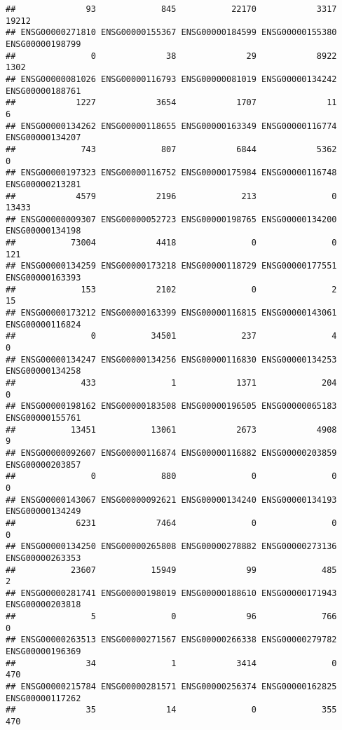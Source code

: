 \documentclass[
]{article}
\begin{document}
\begin{verbatim}
##              93             845           22170            3317           19212 
## ENSG00000271810 ENSG00000155367 ENSG00000184599 ENSG00000155380 ENSG00000198799 
##               0              38              29            8922            1302 
## ENSG00000081026 ENSG00000116793 ENSG00000081019 ENSG00000134242 ENSG00000188761 
##            1227            3654            1707              11               6 
## ENSG00000134262 ENSG00000118655 ENSG00000163349 ENSG00000116774 ENSG00000134207 
##             743             807            6844            5362               0 
## ENSG00000197323 ENSG00000116752 ENSG00000175984 ENSG00000116748 ENSG00000213281 
##            4579            2196             213               0           13433 
## ENSG00000009307 ENSG00000052723 ENSG00000198765 ENSG00000134200 ENSG00000134198 
##           73004            4418               0               0             121 
## ENSG00000134259 ENSG00000173218 ENSG00000118729 ENSG00000177551 ENSG00000163393 
##             153            2102               0               2              15 
## ENSG00000173212 ENSG00000163399 ENSG00000116815 ENSG00000143061 ENSG00000116824 
##               0           34501             237               4               0 
## ENSG00000134247 ENSG00000134256 ENSG00000116830 ENSG00000134253 ENSG00000134258 
##             433               1            1371             204               0 
## ENSG00000198162 ENSG00000183508 ENSG00000196505 ENSG00000065183 ENSG00000155761 
##           13451           13061            2673            4908               9 
## ENSG00000092607 ENSG00000116874 ENSG00000116882 ENSG00000203859 ENSG00000203857 
##               0             880               0               0               0 
## ENSG00000143067 ENSG00000092621 ENSG00000134240 ENSG00000134193 ENSG00000134249 
##            6231            7464               0               0               0 
## ENSG00000134250 ENSG00000265808 ENSG00000278882 ENSG00000273136 ENSG00000263353 
##           23607           15949              99             485               2 
## ENSG00000281741 ENSG00000198019 ENSG00000188610 ENSG00000171943 ENSG00000203818 
##               5               0              96             766               0 
## ENSG00000263513 ENSG00000271567 ENSG00000266338 ENSG00000279782 ENSG00000196369 
##              34               1            3414               0             470 
## ENSG00000215784 ENSG00000281571 ENSG00000256374 ENSG00000162825 ENSG00000117262 
##              35              14               0             355             470 

\end{verbatim}
\end{document}
